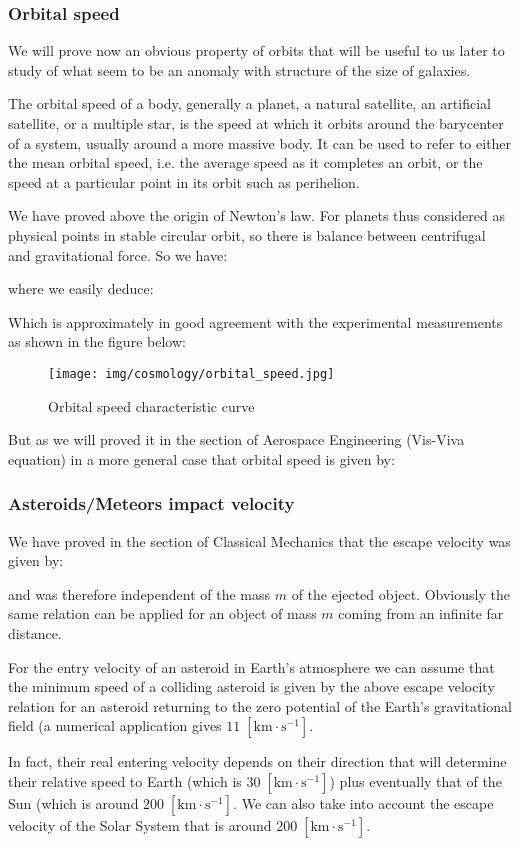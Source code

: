 	\subsubsection{Orbital speed}
	We will prove now an obvious property of orbits that will be useful to us later to study of what seem to be an anomaly with structure of the size of galaxies.
	
	The orbital speed of a body, generally a planet, a natural satellite, an artificial satellite, or a multiple star, is the speed at which it orbits around the barycenter of a system, usually around a more massive body. It can be used to refer to either the mean orbital speed, i.e. the average speed as it completes an orbit, or the speed at a particular point in its orbit such as perihelion.
	
	We have proved above the origin of Newton's law. For planets thus considered as physical points in stable circular orbit, so there is balance between centrifugal and gravitational force. So we have:
	
	where we easily deduce:
	
	Which is approximately in good agreement with the experimental measurements as shown in the figure below:
	\begin{figure}[H]
		\centering
		\texttt{[image: img/cosmology/orbital\_speed.jpg]}	
		\caption{Orbital speed characteristic curve}
	\end{figure}
	But as we will proved it in the section of Aerospace Engineering (Vis-Viva equation) in a more general case that orbital speed is given by:
	
	
	\subsubsection{Asteroids/Meteors impact velocity}
	We have proved in the section of Classical Mechanics that the escape velocity was given by:
	
	and was therefore independent of the mass $m$ of the ejected object. Obviously the same relation can be applied for an object of mass $m$ coming from an infinite far distance.
	
	For the entry velocity of an asteroid in Earth's atmosphere we can assume that the minimum speed of a colliding asteroid is given by the above escape velocity relation for an asteroid returning to the zero potential of the Earth's gravitational field (a numerical application gives ${11 \;[\text{km}\cdot \text{s}^{-1}]}$.

	In fact, their real entering velocity depends on their direction that will determine their relative speed to Earth (which is ${30  \;[\text{km}\cdot \text{s}^{-1}]}$) plus eventually that of the Sun (which is around ${200  \;[\text{km}\cdot \text{s}^{-1}]}$. We can also take into account the escape velocity of the Solar System that is around  ${200  \;[\text{km}\cdot \text{s}^{-1}]}$.

